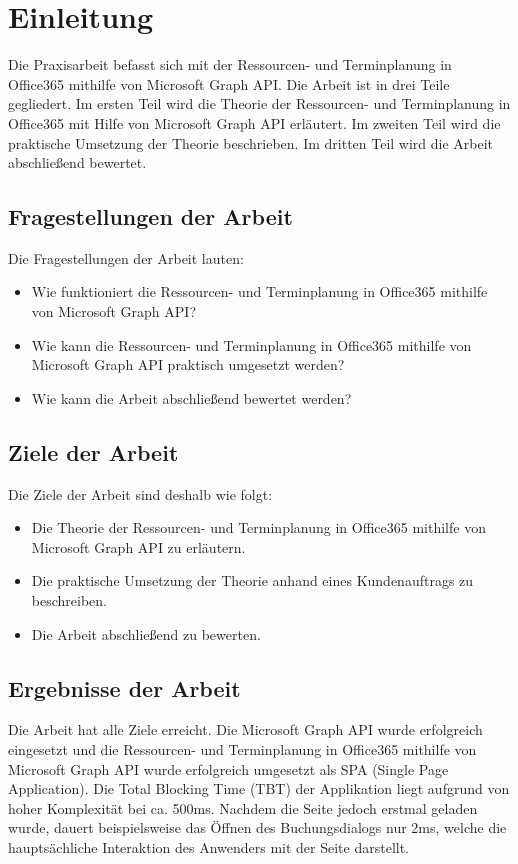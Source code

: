 


\section{Einleitung}\label{sec:einleitung}
Die Praxisarbeit befasst sich mit der Ressourcen- und Terminplanung in Office365 mithilfe von Microsoft Graph API. Die Arbeit ist in drei Teile gegliedert.
Im ersten Teil wird die Theorie der Ressourcen- und Terminplanung in Office365 mit Hilfe von Microsoft Graph API erläutert.
Im zweiten Teil wird die praktische Umsetzung der Theorie beschrieben. Im dritten Teil wird die Arbeit abschließend bewertet.
    \newline
    \subsection{Fragestellungen der Arbeit}\label{subsec:fragestellungen-der-arbeit}
Die Fragestellungen der Arbeit lauten:
    \begin{itemize}
        \item Wie funktioniert die Ressourcen- und Terminplanung in Office365 mithilfe von Microsoft Graph API?
        \item Wie kann die Ressourcen- und Terminplanung in Office365 mithilfe von Microsoft Graph API praktisch umgesetzt werden?
        \item Wie kann die Arbeit abschließend bewertet werden?
    \end{itemize}
    \subsection{Ziele der Arbeit}\label{subsec:ziele-der-arbeit}
Die Ziele der Arbeit sind deshalb wie folgt:
    \begin{itemize}
        \item Die Theorie der Ressourcen- und Terminplanung in Office365 mithilfe von Microsoft Graph API zu erläutern.
        \item Die praktische Umsetzung der Theorie anhand eines Kundenauftrags zu beschreiben.
        \item Die Arbeit abschließend zu bewerten.
    \end{itemize}
    \subsection{Ergebnisse der Arbeit}\label{subsec:ergebnisse-der-arbeit}
Die Arbeit hat alle Ziele erreicht.
    Die Microsoft Graph API wurde erfolgreich eingesetzt und die Ressourcen- und Terminplanung in Office365 mithilfe von Microsoft Graph API wurde erfolgreich umgesetzt als SPA (Single Page Application).
    Die Total Blocking Time (TBT) der Applikation liegt aufgrund von hoher Komplexität bei ca. 500ms.
    Nachdem die Seite jedoch erstmal geladen wurde, dauert beispielsweise das Öffnen des Buchungsdialogs nur 2ms, welche die hauptsächliche Interaktion des Anwenders mit der Seite darstellt.
    \newline
\newpage


